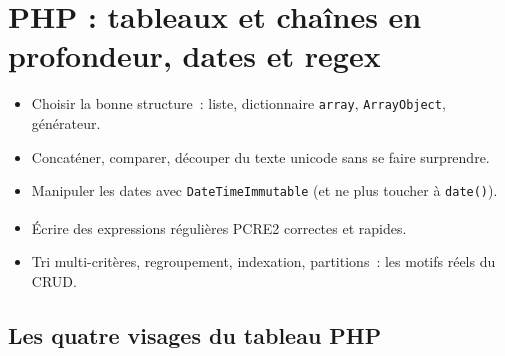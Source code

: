 \chapter{PHP : tableaux et cha\^ines en profondeur, dates et regex}
\label{ch-php-struct}

\begin{objectif}
\begin{itemize}
  \item Choisir la bonne structure~: liste, dictionnaire \verb|array|, \verb|ArrayObject|, g\'en\'erateur.
  \item Concat\'ener, comparer, d\'ecouper du texte unicode sans se faire surprendre.
  \item Manipuler les dates avec \verb|DateTimeImmutable| (et ne plus toucher \`a \verb|date()|).
  \item \'Ecrire des expressions r\'eguli\`eres PCRE\textsuperscript{}{2} correctes et rapides.
  \item Tri multi-crit\`eres, regroupement, indexation, partitions~: les motifs r\'eels du CRUD.
\end{itemize}
\end{objectif}

\section{Les quatre visages du tableau PHP}

